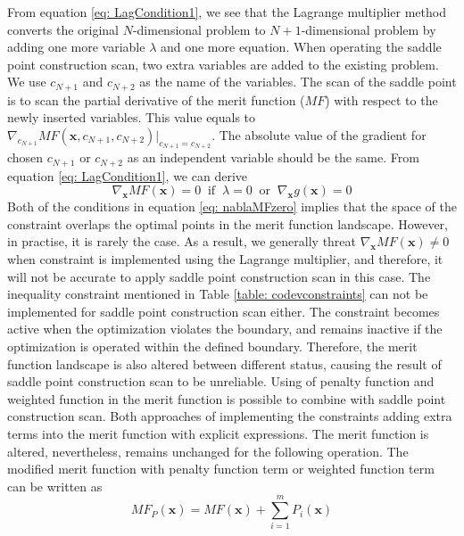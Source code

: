From equation \ref{eq: LagCondition1}, we see that the Lagrange multiplier method converts the original $N$-dimensional problem to $N+1$-dimensional problem by adding one more variable $\lambda$ and one more equation. 
When operating the saddle point construction scan, two extra variables are added to the existing problem. We use $c_{N+1}$ and $c_{N+2}$ as the name of the variables. The scan of the saddle point is to scan the partial derivative of the merit function ($MF$) with respect to the newly inserted variables. This value equals to $\nabla_{c_{N+1}}MF(\textbf{x},c_{N+1},c_{N+2}) \rvert _{c_{N+1}=c_{N+2}}$. The absolute value of the gradient for chosen $c_{N+1}$ or $c_{N+2}$ as an independent variable should be the same. From equation \ref{eq: LagCondition1}, we can derive 
\setlength{\belowdisplayshortskip}{5pt}
\setlength{\abovedisplayshortskip}{5pt}
\begin{equation} \label{eq: nablaMFzero}
\nabla_\textbf{x}MF(\textbf{x}) = 0 \;\; \text{if} \;\; \lambda =0 \;\; \text{or} \;\; \nabla_\textbf{x}g(\textbf{x})=0
\end{equation}
Both of the conditions in equation \ref{eq: nablaMFzero} implies that the space of the constraint overlaps the optimal points in the merit function landscape. However, in practise, it is rarely the case. As a result, we generally threat $\nabla_\textbf{x}MF(\textbf{x}) \neq 0 $ when constraint is implemented using the Lagrange multiplier, and therefore, it will not be accurate to apply saddle point construction scan in this case.
The inequality constraint mentioned in Table \ref{table: codevconstraints} can not be implemented for saddle point construction scan either. The constraint becomes active when the optimization violates the boundary, and remains inactive if the optimization is operated within the defined boundary. Therefore, the merit function landscape is also altered between different status, causing the result of saddle point construction scan to be unreliable. 
Using of penalty function and weighted function in the merit function is possible to combine with saddle point construction scan. Both approaches of implementing the constraints adding extra terms into the merit function with explicit expressions. The merit function is altered, nevertheless, remains unchanged for the following operation. The modified merit function with penalty function term or weighted function term can be written as 
\setlength{\belowdisplayshortskip}{5pt}
\setlength{\abovedisplayshortskip}{5pt}
\begin{equation} \label{eq: MFp}
MF_P(\textbf{x})=MF(\textbf{x})+\sum_{i=1}^{m}P_i(\textbf{x})
\end{equation}
